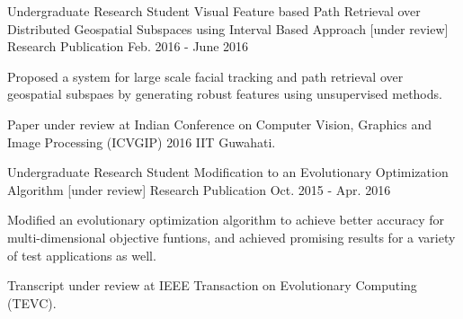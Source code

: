 \begin{cventries}
  \cventry
    {Undergraduate Research Student}
    {Visual Feature based Path Retrieval over Distributed Geospatial Subspaces using Interval Based Approach [under review]}
    {Research Publication}
    {Feb. 2016 - June 2016}
    {
      \begin{cvitems}
        \item {Proposed a system for large scale facial tracking and path retrieval over geospatial subspaes by generating robust features using unsupervised methods.}
        \item {Paper under review at Indian Conference on Computer Vision, Graphics and Image Processing (ICVGIP) 2016 IIT Guwahati.}
      \end{cvitems}
    }
    \cventry
    {Undergraduate Research Student}
    {Modification to an Evolutionary Optimization Algorithm [under review]}
    {Research Publication}
    {Oct. 2015 - Apr. 2016}
    {
      \begin{cvitems}
        \item {Modified an evolutionary optimization algorithm to achieve better accuracy for multi-dimensional objective funtions, and achieved promising results for a variety of test applications as well.}
        \item {Transcript under review at IEEE Transaction on Evolutionary Computing (TEVC).}
      \end{cvitems}
    }
\end{cventries}
